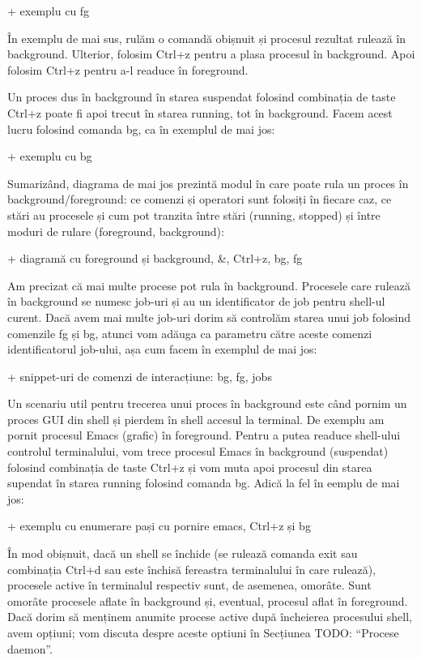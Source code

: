 + exemplu cu fg

În exemplu de mai sus, rulăm o comandă obișnuit și procesul rezultat rulează în
background. Ulterior, folosim Ctrl+z pentru a plasa procesul în background. Apoi
folosim Ctrl+z pentru a-l readuce în foreground.

Un proces dus în background în starea suspendat folosind combinația de taste
Ctrl+z poate fi apoi trecut în starea running, tot în background. Facem acest
lucru folosind comanda bg, ca în exemplul de mai jos:

+ exemplu cu bg

Sumarizând, diagrama de mai jos prezintă modul în care poate rula un proces în
background/foreground: ce comenzi și operatori sunt folosiți în fiecare caz, ce
stări au procesele și cum pot tranzita între stări (running, stopped) și între
moduri de rulare (foreground, background):

+ diagramă cu foreground și background, \&, Ctrl+z, bg, fg

Am precizat că mai multe procese pot rula în background. Procesele care rulează
în background se numesc job-uri și au un identificator de job pentru shell-ul
curent. Dacă  avem mai multe job-uri dorim să controlăm starea unui job folosind
comenzile fg și bg, atunci vom adăuga ca parametru către aceste comenzi
identificatorul job-ului, așa cum facem în exemplul de mai jos:

+ snippet-uri de comenzi de interacțiune: bg, fg, jobs

Un scenariu util pentru trecerea unui proces în background este când pornim un
proces GUI din shell și pierdem în shell accesul la terminal. De exemplu am
pornit procesul Emacs (grafic) în foreground. Pentru a putea readuce shell-ului
controlul terminalului, vom trece procesul Emacs în background (suspendat)
folosind combinația de taste Ctrl+z și vom muta apoi procesul din starea
supendat în starea running folosind comanda bg. Adică la fel în eemplu de mai
jos:

+ exemplu cu enumerare pași cu pornire emacs, Ctrl+z și bg

În mod obișnuit, dacă un shell se închide (se rulează comanda exit sau
combinația Ctrl+d sau este închisă fereastra terminalului în care rulează),
procesele active în terminalul respectiv sunt, de asemenea, omorâte. Sunt
omorâte procesele aflate în background și, eventual, procesul aflat în
foreground. Dacă dorim să menținem anumite procese active după încheierea
procesului shell, avem opțiuni; vom discuta despre aceste optiuni  în Secțiunea
TODO: “Procese daemon”.

